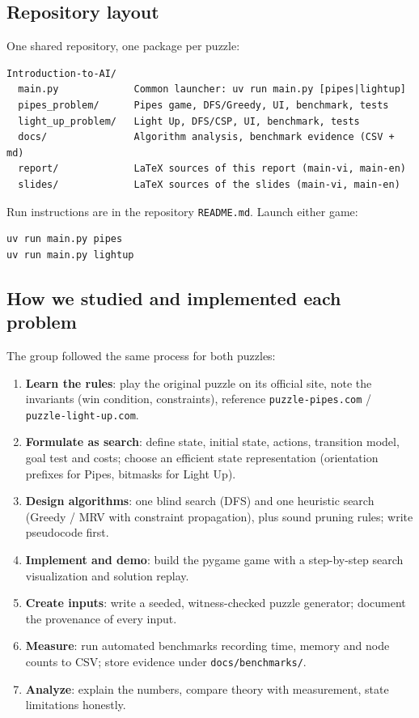 \documentclass[12pt,a4paper]{article}
\newcommand{\code}[1]{\texttt{#1}}
\begin{document}
\subsection{Repository layout}

One shared repository, one package per puzzle:

\begin{lstlisting}
Introduction-to-AI/
  main.py             Common launcher: uv run main.py [pipes|lightup]
  pipes_problem/      Pipes game, DFS/Greedy, UI, benchmark, tests
  light_up_problem/   Light Up, DFS/CSP, UI, benchmark, tests
  docs/               Algorithm analysis, benchmark evidence (CSV + md)
  report/             LaTeX sources of this report (main-vi, main-en)
  slides/             LaTeX sources of the slides (main-vi, main-en)
\end{lstlisting}

Run instructions are in the repository \code{README.md}. Launch either game:
\begin{lstlisting}
uv run main.py pipes
uv run main.py lightup
\end{lstlisting}

\subsection{How we studied and implemented each problem}

The group followed the same process for both puzzles:

\begin{enumerate}
\item \textbf{Learn the rules}: play the original puzzle on its official site,
note the invariants (win condition, constraints), reference
\code{puzzle-pipes.com} / \code{puzzle-light-up.com}.
\item \textbf{Formulate as search}: define state, initial state, actions,
transition model, goal test and costs; choose an efficient state representation
(orientation prefixes for Pipes, bitmasks for Light Up).
\item \textbf{Design algorithms}: one blind search (DFS) and one heuristic search
(Greedy / MRV with constraint propagation), plus sound pruning rules; write pseudocode first.
\item \textbf{Implement and demo}: build the pygame game with a step-by-step
search visualization and solution replay.
\item \textbf{Create inputs}: write a seeded, witness-checked puzzle generator;
document the provenance of every input.
\item \textbf{Measure}: run automated benchmarks recording time, memory and node
counts to CSV; store evidence under \code{docs/benchmarks/}.
\item \textbf{Analyze}: explain the numbers, compare theory with measurement,
state limitations honestly.
\end{enumerate}
\end{document}
